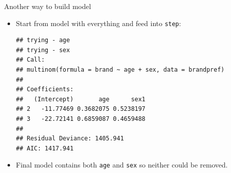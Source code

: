 \begin{frame}[fragile]{Another way to build model}
  
  \begin{itemize}
  \item Start from model with everything and feed into \texttt{step}:
    
    {\small
\begin{knitrout}
\color{fgcolor}\begin{kframe}
\begin{alltt}
\hlstd{=}\hlstd{)}
\end{alltt}
\begin{verbatim}
## trying - age 
## trying - sex
## Call:
## multinom(formula = brand ~ age + sex, data = brandpref)
## 
## Coefficients:
##   (Intercept)       age      sex1
## 2   -11.77469 0.3682075 0.5238197
## 3   -22.72141 0.6859087 0.4659488
## 
## Residual Deviance: 1405.941 
## AIC: 1417.941
\end{verbatim}
\end{kframe}
\end{knitrout}
}

\item Final model contains both \texttt{age} and \texttt{sex} so neither
could be removed.
  \end{itemize}
  
\end{frame}

